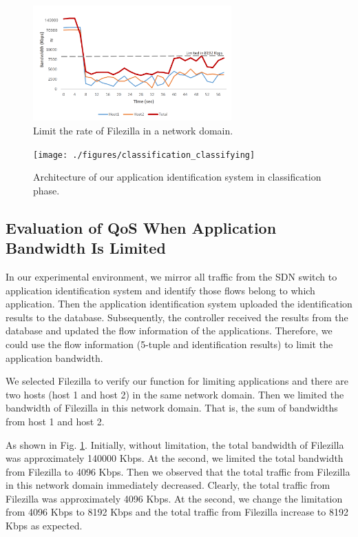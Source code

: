 \documentclass[conference]{IEEEtran}
\begin{document}
\begin{figure}[!t]
\centering
\includegraphics[width=3in]{./figures/mft_qos_rate_domain_app}
\caption{Limit the rate of Filezilla in a network domain.}
\label{fig:mft_qos_rate_domain_app}
\end{figure}

\begin{figure}[!t]
\centering
\texttt{[image: ./figures/classification\_classifying]}
\caption{Architecture of our application identification system in classification phase.}
\label{fig:class_classifying}
\end{figure}

\subsection{Evaluation of QoS When Application Bandwidth Is Limited}
In our experimental environment, we mirror all traffic from the SDN switch to application identification system and identify those flows belong to which application.
Then the application identification system uploaded the identification results to the database.
Subsequently, the controller received the results from the database and updated the flow information of the applications.
Therefore, we could use the flow information (5-tuple and identification results) to limit the application bandwidth.

We selected Filezilla to verify our function for limiting applications and there are two hosts (host 1 and host 2) in the same network domain.
Then we limited the bandwidth of Filezilla in this network domain. That is, the sum of bandwidths from host 1 and host 2.

As shown in Fig. \ref{fig:mft_qos_rate_domain_app}.
Initially, without limitation, the total bandwidth of Filezilla was approximately 140000 Kbps.
At the  second, we limited the total bandwidth from Filezilla to 4096 Kbps.
Then we observed that the total traffic from Filezilla in this network domain immediately decreased.
Clearly, the total traffic from Filezilla was approximately 4096 Kbps.
At the  second, we change the limitation from 4096 Kbps to 8192 Kbps and the total traffic from Filezilla increase to 8192 Kbps as expected.
\end{document}
